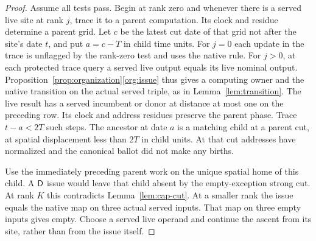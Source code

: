 \begin{proof}
Assume all tests pass. Begin at rank zero and whenever there is a served live site at rank \(j\), trace it to a parent computation. Its clock and residue determine a parent grid. Let \(c\) be the latest cut date of that grid not after the site's date \(t\), and put \(a=c-T\) in child time units. For \(j=0\) each update in the trace is unflagged by the rank-zero test and uses the native rule. For \(j>0\), at each protected trace query a served live output equals its live nominal output. Proposition~\ref{prop:organization}\ref{org:issue} thus gives a computing owner and the native transition on the actual served triple, as in Lemma~\ref{lem:transition}. The live result has a served incumbent or donor at distance at most one on the preceding row. Its clock and address residues preserve the parent phase. Trace \(t-a<2T\) such steps. The ancestor at date \(a\) is a matching child at a parent cut, at spatial displacement less than \(2T\) in child units. At that cut addresses have normalized and the canonical ballot did not make any births.

Use the immediately preceding parent work on the unique spatial home of this child. A \(\mathsf D\) issue would leave that child absent by the empty-exception strong cut. At rank \(K\) this contradicts Lemma~\ref{lem:cap-cut}. At a smaller rank the issue equals the native map on three actual served inputs. That map on three empty inputs gives empty. Choose a served live operand and continue the ascent from its site, rather than from the issue itself.


\end{proof}
